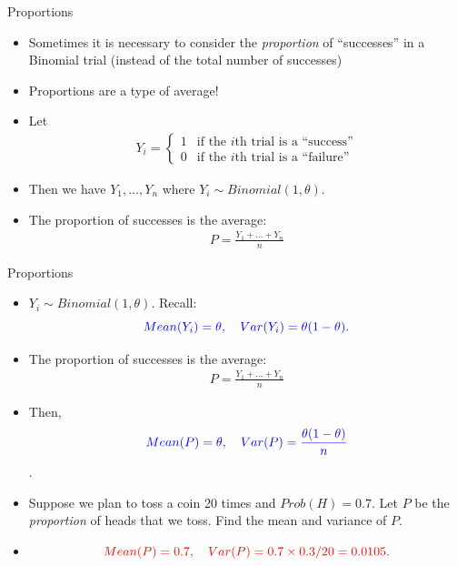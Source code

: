 \documentclass[10pt, handout, xcolor=table]{beamer}
\begin{document}
\begin{frame}{Proportions}

\begin{itemize}
\setlength{\itemsep}{15pt}
\item<1-> Sometimes it is necessary to consider the \emph{proportion} of ``successes'' in a Binomial trial (instead of the total number of successes)
\item<2-> Proportions are a type of average!
\item<3-> Let 
\begin{align*}
Y_i = 
\begin{cases}
1 &\text{if the }i\text{th trial is a ``success''}\\
0 &\text{if the }i\text{th trial is a ``failure''}
\end{cases}
\end{align*}
\item<4-> Then we have $Y_1,\dots, Y_n$ where $Y_i\sim Binomial(1,\theta)$.
\item<5-> The proportion of successes is the average:
\begin{align*}
P = \frac{Y_1 + \dots + Y_n}{n}
\end{align*}
\end{itemize}
\end{frame}

\begin{frame}{Proportions}
\begin{itemize}
\setlength{\itemsep}{-5pt}
\item<1-> $Y_i \sim Binomial(1,\theta)$. Recall: 
$$\color{blue} Mean(Y_i) = \theta, \quad Var(Y_i) = \theta(1-\theta).$$
\item<2-> The proportion of successes is the average:
\begin{align*}
P = \frac{Y_1 + \dots + Y_n}{n}
\end{align*}
\item<3-> Then, 
$$\color{blue} Mean(P) = \theta, \quad Var(P) = \frac{\theta(1-\theta)}{n}$$.
\vspace{0.5cm}
\item<4->[Q5:] Suppose we plan to toss a coin 20 times and $Prob(H) = 0.7$. Let $P$ be the \emph{proportion} of heads that we toss. Find the mean and variance of $P$.
\vspace{0.25cm}
\item<5->[A5:] 
 $$\color{red}Mean(P) = 0.7, \quad Var(P) = 0.7\times 0.3 / 20 = 0.0105.$$
\end{itemize}
\end{frame}
\end{document}
